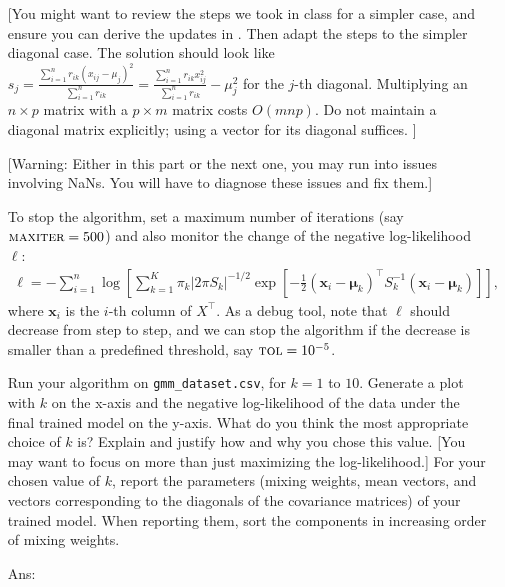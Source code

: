 \documentclass[10pt,letter,notitlepage]{article}
\newcommand{\xv}{\mathbf{x}}
\newcommand{\ans}[1]{{\color{orange}\textsf{Ans}: #1}}
\newcounter{exercise}
\begin{document}
\begin{exercise}
\begin{enumerate}[label=\alph*)]
		[You might want to review the steps we took in class for a simpler case, and ensure you can derive the updates in . Then adapt the steps to the simpler diagonal case. The solution should look like $s_j = \frac{\sum_{i=1}^n r_{ik} (x_{ij} - \mu_j)^2}{\sum_{i=1}^n r_{ik} } = \frac{\sum_{i=1}^n r_{ik} x_{ij} ^2}{\sum_{i=1}^n r_{ik} } - \mu_j^2$ for the $j$-th diagonal. Multiplying an $n\times p$ matrix with a $p\times m$ matrix costs $O(mnp)$. Do not maintain a diagonal matrix explicitly; using a vector for its diagonal suffices. ]
		
      [Warning: Either in this part or the next one, you may run into issues involving NaNs. You will have to diagnose these issues and fix them.]

		To stop the algorithm, set a maximum number of iterations (say $\textsc{maxiter} = 500$) and also monitor the change of the negative log-likelihood $\ell$: 
		\begin{align}
		\ell = -\sum_{i=1}^n \log\left[\sum_{k=1}^K \pi_k |2\pi S_k|^{-1/2} \exp[ -\tfrac{1}{2}(\xv_i -\boldsymbol{\mu}_k)^\top S_k^{-1} (\xv_i - \boldsymbol{\mu}_k ) ]\right],
		\end{align}
		where $\xv_i$ is the $i$-th column of $X^\top$.
		As a debug tool, note that $\ell$ should decrease from step to step, and we can stop the algorithm if the decrease is smaller than a predefined threshold, say $\textsc{tol} = 10^{-5}$.
      \label{ex:gmm}


    Run your algorithm on \texttt{gmm\_dataset.csv}, for $k = 1$ to $10$. 
    Generate a plot with $k$ on the x-axis and the negative log-likelihood of the data under the final trained model on the y-axis. 
    What do you think the most appropriate choice of $k$ is?
    Explain and justify how and why you chose this value. 
    [You may want to focus on more than just maximizing the log-likelihood.]
    For your chosen value of $k$, report the parameters (mixing weights, mean vectors, and vectors corresponding to the diagonals of the covariance matrices) of your trained model.
    When reporting them, sort the components in increasing order of mixing weights.

		
		\ans{}
			

\end{enumerate}
\end{exercise}
\end{document}

